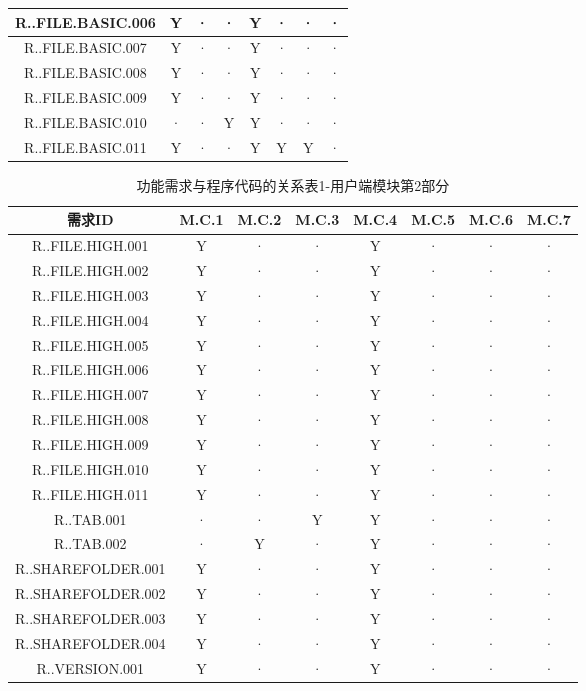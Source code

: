 {\begin{table}[htbp]
\begin{tabular}{|c|c|c|c|c|c||c|c|}
    \hline
    R..FILE.BASIC.006 & Y  &·  & · & Y  &· & · & ·\\ 
    \hline
    R..FILE.BASIC.007 & Y  &·  & · & Y  &· & · & ·\\
    \hline
    R..FILE.BASIC.008 & Y  &·  & · & Y  &· & · & ·\\
    \hline
    R..FILE.BASIC.009 & Y  &·  & · & Y  &· & · & ·\\ 
    \hline
    R..FILE.BASIC.010 &·  & · & Y & Y  &· & · & ·\\ 
    \hline
    R..FILE.BASIC.011 &Y  & · & · & Y  &Y & Y & ·\\ 
    \hline
\end{tabular}
\end{table}

\begin{table}[htbp]
\centering
        \color{red}

\caption{功能需求与程序代码的关系表1-用户端模块第2部分} \label{tab:requirement-module}
\begin{tabular}{|c|c|c|c|c|c||c|c|}
    \hline 
    需求ID & M.C.1 & M.C.2 & M.C.3 & M.C.4 & M.C.5 & M.C.6 & M.C.7\\
    \hline  
    R..FILE.HIGH.001 & Y  &·  & · &Y  &· & · & ·\\
    \hline
    R..FILE.HIGH.002 & Y  &·  & · & Y  &· & · & ·\\
    \hline
    R..FILE.HIGH.003 & Y &· &· & Y  &· & · & ·\\
    \hline
    R..FILE.HIGH.004 & Y &· &· &Y  &· & · & ·\\
    \hline 
    R..FILE.HIGH.005 & Y &· &· & Y  &· & · & ·\\
    \hline
    R..FILE.HIGH.006 &Y  &· &· &   Y& ·& · & ·\\
    \hline
    R..FILE.HIGH.007 &Y  &·  &·  &  Y& ·& · & ·\\
    \hline 
    R..FILE.HIGH.008 &Y  &·  &·  &  Y& ·& · & ·\\
    \hline
    R..FILE.HIGH.009 &Y  &·  &·  &   Y& ·& · & ·\\
    \hline
    R..FILE.HIGH.010 &Y &· &· &   Y& ·& · & ·\\
    \hline
    R..FILE.HIGH.011 &Y  &· &· &   Y&  ·& · & ·\\
    \hline
    R..TAB.001 &·  &· &Y &   Y&  ·& · & ·\\
    \hline 
    R..TAB.002 &·   &Y  &·  &   Y& ·& · & ·\\
    \hline
    R..SHAREFOLDER.001 &  Y &·  &·  &  Y& ·& · & ·\\
    \hline
    R..SHAREFOLDER.002 &  Y &·  &·  &  Y& ·& · & ·\\
    \hline
    R..SHAREFOLDER.003 &  Y &·  &·  &   Y& ·& · & ·\\ 
    \hline
    R..SHAREFOLDER.004 &  Y &·  &·  &   Y& ·& · & ·\\
    \hline
    R..VERSION.001 &  Y &·  &·  &   Y& ·& · & ·\\
    \hline
\end{tabular}
\end{table}
 
}
